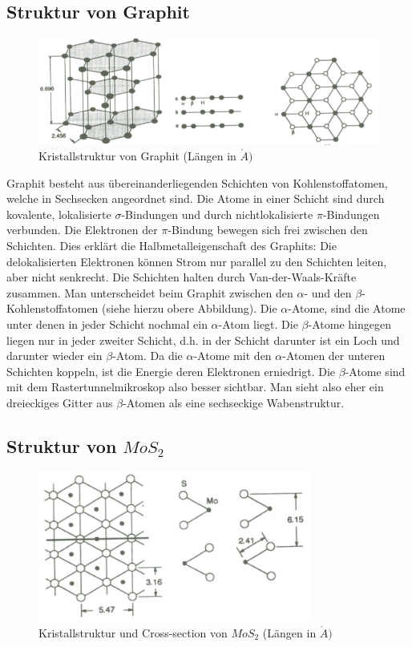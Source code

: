 \subsection{Struktur von Graphit}

\begin{figure}[H]
	\centering \includegraphics[width=\textwidth]{Bilder/Graphit.png}
	\caption{Kristallstruktur von Graphit (Längen in $\mathring{A})$}
\end{figure}

Graphit besteht aus übereinanderliegenden Schichten von Kohlenstoffatomen, welche in Sechsecken angeordnet sind. Die Atome in einer Schicht sind durch kovalente, lokalisierte $\sigma$-Bindungen und durch nichtlokalisierte $\pi$-Bindungen verbunden. Die Elektronen der $\pi$-Bindung bewegen sich frei zwischen den Schichten. Dies erklärt die Halbmetalleigenschaft des Graphits: Die delokalisierten Elektronen können Strom nur parallel zu den Schichten leiten, aber nicht senkrecht. Die Schichten halten durch Van-der-Waals-Kräfte zusammen. Man unterscheidet beim Graphit zwischen den $\alpha$- und den $\beta$-Kohlenstoffatomen (siehe hierzu obere Abbildung). Die $\alpha$-Atome, sind die Atome unter denen in jeder Schicht nochmal ein $\alpha$-Atom liegt. Die $\beta$-Atome hingegen liegen nur in jeder zweiter Schicht, d.h. in der Schicht darunter ist ein Loch und darunter wieder ein $\beta$-Atom. Da die $\alpha$-Atome mit den $\alpha$-Atomen der unteren Schichten koppeln, ist die Energie deren Elektronen erniedrigt. Die $\beta$-Atome sind mit dem Rastertunnelmikroskop also besser sichtbar. Man sieht also eher ein dreieckiges Gitter aus $\beta$-Atomen als eine sechseckige Wabenstruktur.

\subsection{Struktur von $MoS_2$}

\begin{figure}[H]
	\centering \includegraphics[width=0.8\textwidth]{Bilder/MoS2.png}
	\caption{Kristallstruktur und Cross-section von $MoS_2$ (Längen in $\mathring{A})$}
\end{figure}

